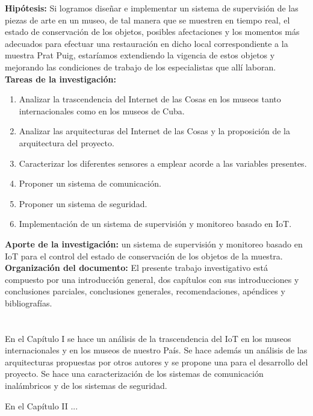     \textbf{Hipótesis: }Si logramos diseñar e implementar un sistema de supervisión de las piezas de arte en un museo, de tal manera que se muestren en tiempo real, el estado de conservación de los objetos, posibles afectaciones y los momentos más adecuados para efectuar una restauración en dicho local correspondiente a la muestra Prat Puig, estaríamos extendiendo la vigencia de estos objetos y mejorando las condiciones de trabajo de los especialistas que allí laboran.\\

    \textbf{Tareas de la investigación:}
    \begin{enumerate} %
        \item Analizar la trascendencia del Internet de las Cosas en los museos tanto internacionales como en los museos de Cuba.
        \item Analizar las arquitecturas del Internet de las Cosas y la proposición de la arquitectura del proyecto.
        \item Caracterizar los diferentes sensores a emplear acorde a las variables presentes.
        \item Proponer un sistema de comunicación.
        \item Proponer un sistema de seguridad.
        \item Implementación de un sistema de supervisión y monitoreo basado en IoT.
    \end{enumerate}

    \textbf{Aporte de la investigación: } un sistema de supervisión y monitoreo basado en IoT para el control del estado de conservación de los objetos de la muestra.\\

    \textbf{Organización del documento: }El presente trabajo investigativo está compuesto por una introducción general, dos capítulos con sus introducciones y conclusiones parciales, conclusiones generales, recomendaciones, apéndices y bibliografías.\\\\\\

    En el Capítulo I se hace un análisis de la trascendencia del IoT en los museos internacionales y en los museos de nuestro País.
    Se hace además un análisis de las arquitecturas propuestas por otros autores y se propone una para el desarrollo del proyecto.
    Se hace una caracterización de los sistemas de comunicación inalámbricos y de los sistemas de seguridad.

    En el Capítulo II ...    

    